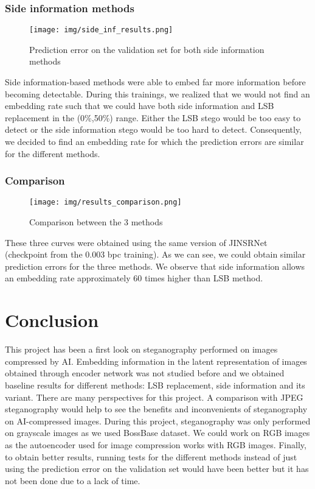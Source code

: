 \documentclass[12pt]{article}
\begin{document}
\subsubsection{Side information methods}
\begin{figure}[H]
    \texttt{[image: img/side\_inf\_results.png]}
    \caption[Side information methods results]{Prediction error on the validation set for both side information methods}
    \label{fig:side_inf_results}
\end{figure}
Side information-based methods were able to embed far more information before becoming detectable. During this trainings, we realized that we would not find an embedding rate such that we could have both side information and LSB replacement in the (0\%,50\%) range. Either the LSB stego would be too easy to detect or the side information stego would be too hard to detect. Consequently, we decided to find an embedding rate for which the prediction errors are similar for the different methods.

\subsubsection{Comparison}
\begin{figure}[H]
    \texttt{[image: img/results\_comparison.png]}
    \caption[Comparative results]{Comparison between the 3 methods}
    \label{fig:results_comparison}
\end{figure}
These three curves were obtained using the same version of JINSRNet (checkpoint from the 0.003 bpc training). As we can see, we could obtain similar prediction errors for the three methods. We observe that side information allows an embedding rate approximately 60 times higher than LSB method.

\section{Conclusion}
This project has been a first look on steganography performed on images compressed by AI. Embedding information in the latent representation of images obtained through encoder network was not studied before and we obtained baseline results for different methods: LSB replacement, side information and its variant. There are many perspectives for this project. A comparison with JPEG steganography  would help to see the benefits and inconvenients of steganography on AI-compressed images. During this project, steganography was only performed on grayscale images as we used BossBase dataset. We could work on RGB images as the autoencoder used for image compression works with RGB images. Finally, to obtain better results, running tests for the different methods instead of just using the prediction error on the validation set would have been better but it has not been done due to a lack of time.

\printbibliography
\end{document}
